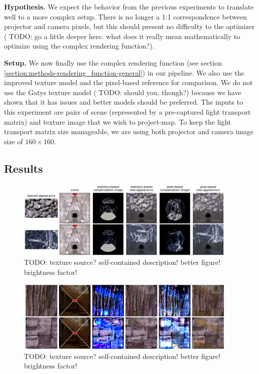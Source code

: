 \textbf{Hypothesis.} We expect the behavior from the previous experiments to translate well to a more complex setup. There is no longer a 1:1 correspondence between projector and camera pixels, but this should present no difficulty to the optimizer ({\color{red} TODO: go a little deeper here. what does it really mean mathematically to optimize using the complex rendering function?}).

\textbf{Setup.} We now finally use the complex rendering function (see section \ref{section:methods-rendering_function-general}) in our pipeline. We also use the improved texture model and the pixel-based reference for comparison. We do not use the Gatys texture model ({\color{red} TODO: should you, though?}) because we have shown that it has issues and better models should be preferred. The inputs to this experiment are pairs of scene (represented by a pre-captured light transport matrix) and texture image that we wish to project-map. To keep the light transport matrix size manageable, we are using both projector and camera image size of \(160 \times 160\).

\subsection{Results}
\label{section:results-experiments-03-results}

\begin{figure}[ht]
    \begin{center}
        \includegraphics[width=0.95\textwidth]{images/ex03-ball-dof-crop.png}
        \caption{{\color{red} TODO: texture source? self-contained description! better figure! brightness factor!}}
        \label{fig:ex03-ball-dof}
    \end{center}
\end{figure}

\begin{figure}[ht]
    \begin{center}
        \includegraphics[width=0.95\textwidth]{images/ex03-staircase-illum-crop.png}
        \caption{{\color{red} TODO: texture source? self-contained description! better figure! brightness factor!}}
        \label{fig:ex03-staircase-illum}
    \end{center}
\end{figure}

